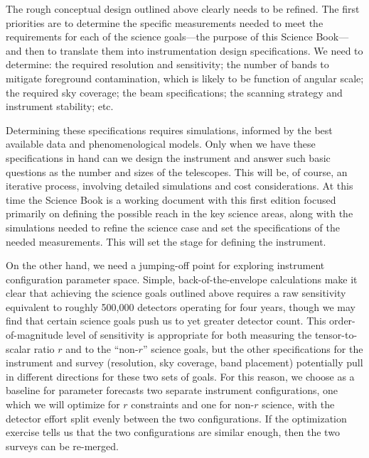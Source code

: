 The rough conceptual design outlined above clearly needs to be refined.  The first priorities are to determine the specific measurements needed to meet the requirements for each of the science goals---the purpose of this Science Book---and then to translate them into instrumentation design specifications. We need to determine:  the required resolution and sensitivity; the number of bands to mitigate foreground contamination, which is likely to be function of angular scale; the required sky coverage; the beam specifications; the scanning strategy and instrument stability; etc. 

Determining these specifications requires simulations, informed by the best available data and phenomenological models.  Only when we have these specifications in hand can we design the instrument and answer such basic questions as the number and sizes of the telescopes.  This will be, of course, an iterative process, involving detailed simulations and cost considerations. At this time the Science Book is a working document with this first edition focused primarily on defining the possible reach in the  key science areas, along with the simulations needed to refine the science case and set the specifications of the needed measurements. This will set the stage for defining the instrument.



On the other hand, we need a jumping-off point for exploring instrument configuration parameter space.  
Simple, back-of-the-envelope calculations make it clear that achieving the science goals outlined above requires a raw sensitivity equivalent to roughly 500,000 detectors operating for four years, though we may find that certain science goals push us to yet greater detector count. This order-of-magnitude level of sensitivity is appropriate for both measuring the tensor-to-scalar ratio $r$ and to the ``non-$r$'' science goals, but the other specifications for the instrument and survey (resolution, sky coverage, band placement) potentially pull in different directions for these two sets of goals. For this reason, we choose as a baseline for parameter forecasts two separate instrument configurations, one which we will optimize for $r$ constraints and one for non-$r$ science, with the detector effort split evenly between the two configurations. If the optimization exercise tells us that the two configurations are similar enough, then the two surveys can be re-merged. 

